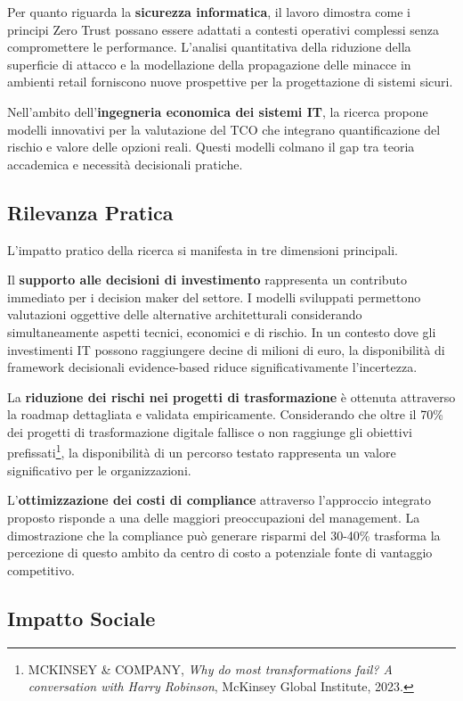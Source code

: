 Per quanto riguarda la \textbf{sicurezza informatica}, il lavoro dimostra come i principi Zero Trust possano essere adattati a contesti operativi complessi senza compromettere le performance. L'analisi quantitativa della riduzione della superficie di attacco e la modellazione della propagazione delle minacce in ambienti retail forniscono nuove prospettive per la progettazione di sistemi sicuri.

Nell'ambito dell'\textbf{ingegneria economica dei sistemi IT}, la ricerca propone modelli innovativi per la valutazione del TCO che integrano quantificazione del rischio e valore delle opzioni reali. Questi modelli colmano il gap tra teoria accademica e necessità decisionali pratiche.

\subsection{Rilevanza Pratica}

L'impatto pratico della ricerca si manifesta in tre dimensioni principali.

Il \textbf{supporto alle decisioni di investimento} rappresenta un contributo immediato per i decision maker del settore. I modelli sviluppati permettono valutazioni oggettive delle alternative architetturali considerando simultaneamente aspetti tecnici, economici e di rischio. In un contesto dove gli investimenti IT possono raggiungere decine di milioni di euro, la disponibilità di framework decisionali evidence-based riduce significativamente l'incertezza.

La \textbf{riduzione dei rischi nei progetti di trasformazione} è ottenuta attraverso la roadmap dettagliata e validata empiricamente. Considerando che oltre il 70\% dei progetti di trasformazione digitale fallisce o non raggiunge gli obiettivi prefissati\footnote{MCKINSEY \& COMPANY, \textit{Why do most transformations fail? A conversation with Harry Robinson}, McKinsey Global Institute, 2023.}, la disponibilità di un percorso testato rappresenta un valore significativo per le organizzazioni.

L'\textbf{ottimizzazione dei costi di compliance} attraverso l'approccio integrato proposto risponde a una delle maggiori preoccupazioni del management. La dimostrazione che la compliance può generare risparmi del 30-40\% trasforma la percezione di questo ambito da centro di costo a potenziale fonte di vantaggio competitivo.

\subsection{Impatto Sociale}

